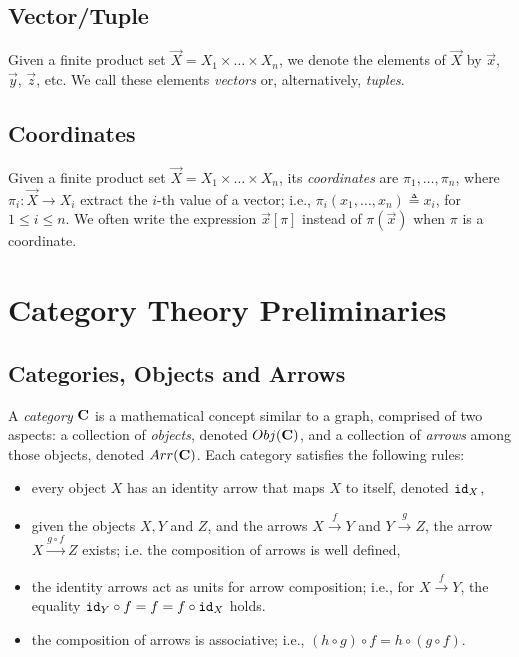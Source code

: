 \subsection{Vector/Tuple}
Given a finite product set $\vec{X}=X_1\times \ldots \times X_n$, we denote the elements of $\vec{X}$ by $\vec{x}$, $\vec{y}$, $\vec{z}$, etc. We call these elements \emph{vectors} or, alternatively, \emph{tuples}. 

\subsection{Coordinates}
Given a finite product set $\vec{X}=X_1\times \ldots \times X_n$, its \emph{coordinates} are $\pi_1, \ldots, \pi_n$, where $\pi_i\colon \vec{X} \rightarrow X_i$ extract the $i$-th value of a vector; i.e., $\pi_i(x_1, \ldots, x_n)\triangleq x_i$, for $1\leq i \leq n$. We often write the expression $\vec{x}[\pi]$ instead of $\pi(\vec{x})$ when $\pi$ is a coordinate.


\section{Category Theory Preliminaries}

\subsection{Categories, Objects and Arrows}
A \emph{category} $\AsCategory{C}$ is a mathematical concept similar to a graph, comprised of two aspects: a collection of \emph{objects}, denoted $Obj(\AsCategory{C})$, and a collection of \emph{arrows} among those objects, denoted $Arr(\AsCategory{C})$. Each category satisfies the following  rules:
\begin{itemize}
    \item every object $X$ has an identity arrow that maps $X$ to itself, denoted ${\texttt{id}}_X$,
    \item given the objects $X, Y$ and $Z$, and the arrows $X\xrightarrow{f}Y$ and $Y\xrightarrow{g}Z$, the arrow $X\xrightarrow{g\circ f}Z$ exists; i.e. the composition of arrows is well defined,
    \item the identity arrows act as units for arrow composition; i.e., for $X\xrightarrow{f}Y$, the equality ${\texttt{id}}_{Y}\circ f=f=f\circ {\texttt{id}}_{X}$ holds.
    \item the composition of arrows is associative; i.e., $(h\circ g)\circ f = h \circ (g\circ f)$.
\end{itemize}

